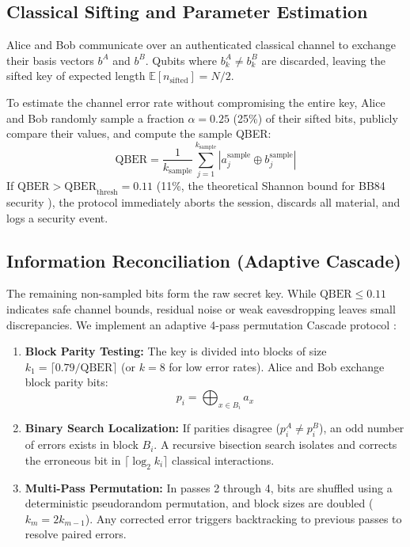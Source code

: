 \documentclass[journal,10pt,twocolumn]{article}
\begin{document}
\subsection{Classical Sifting and Parameter Estimation}
Alice and Bob communicate over an authenticated classical channel to exchange their basis vectors $b^A$ and $b^B$. Qubits where $b_k^A \neq b_k^B$ are discarded, leaving the sifted key of expected length $\mathbb{E}[n_{\text{sifted}}] = N/2$.

To estimate the channel error rate without compromising the entire key, Alice and Bob randomly sample a fraction $\alpha = 0.25$ (25\%) of their sifted bits, publicly compare their values, and compute the sample QBER:
\begin{equation}
\text{QBER} = \frac{1}{k_{\text{sample}}} \sum_{j=1}^{k_{\text{sample}}} |a_j^{\text{sample}} \oplus b_j^{\text{sample}}|
\end{equation}
If $\text{QBER} > \text{QBER}_{\text{thresh}} = 0.11$ (11\%, the theoretical Shannon bound for BB84 security \cite{brassard1994secret}), the protocol immediately aborts the session, discards all material, and logs a security event.

\subsection{Information Reconciliation (Adaptive Cascade)}
The remaining non-sampled bits form the raw secret key. While $\text{QBER} \le 0.11$ indicates safe channel bounds, residual noise or weak eavesdropping leaves small discrepancies. We implement an adaptive 4-pass permutation Cascade protocol \cite{brassard1994secret}:
\begin{enumerate}
    \item \textbf{Block Parity Testing:} The key is divided into blocks of size $k_1 = \lceil 0.79 / \text{QBER} \rceil$ (or $k=8$ for low error rates). Alice and Bob exchange block parity bits:
    \begin{equation}
    p_i = \bigoplus_{x \in B_i} a_x
    \end{equation}
    \item \textbf{Binary Search Localization:} If parities disagree ($p_i^A \neq p_i^B$), an odd number of errors exists in block $B_i$. A recursive bisection search isolates and corrects the erroneous bit in $\lceil \log_2 k_i \rceil$ classical interactions.
    \item \textbf{Multi-Pass Permutation:} In passes 2 through 4, bits are shuffled using a deterministic pseudorandom permutation, and block sizes are doubled ($k_m = 2 k_{m-1}$). Any corrected error triggers backtracking to previous passes to resolve paired errors.
\end{enumerate}
\end{document}
